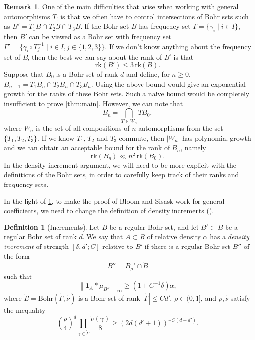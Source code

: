 \documentclass{daj}
\theoremstyle{definition}
\newtheorem{definition}[theorem]{Definition}
\newtheorem{remark}[theorem]{Remark}
\newcommand{\m}[1]{\mu_{#1}}
\newcommand{\ind}[1]{\mathbf{1}_{#1}}
\newcommand{\norm}[1]{\left\|#1\right\|}
\begin{document}
\begin{remark}
\label{rem:frequencysets}
One of the main difficulties that arise when working with general automorphisms $T_i$ is that we often have to control intersections of Bohr sets such as $B' = T_1B \cap T_2B \cap T_3B$. If the Bohr set $B$ has frequency set $\Gamma = \{\gamma_i \mid i\in I\}$, then $B'$ can be viewed as a Bohr set with frequency set $\Gamma' = \{\gamma_i \circ T_j^{-1}\mid i\in I, j\in \{1,2,3\}\}$. If we don't know anything about the frequency set of $B$, then the best we can say about the rank of $B'$ is that 
\begin{equation*}
\mathrm{rk}(B') \leq 3\,\mathrm{rk}(B).
\end{equation*}
Suppose that $B_0$ is a Bohr set of rank $d$ and define, for $n\geq 0$, $B_{n+1} = T_1B_n \cap T_2B_n \cap T_3B_n$. Using the above bound would give an exponential growth for the ranks of these Bohr sets. Such a naive bound would be completely insufficient to prove \cref{thm:main}. However, we can note that 
\begin{equation*}
B_n = \bigcap_{T\in W_n} TB_0,
\end{equation*}
where $W_n$ is the set of all compositions of $n$ automorphisms from the set $\{T_1, T_2, T_3\}$. If we know $T_1$, $T_2$ and $T_3$ commute, then $|W_n|$ has polynomial growth and we can obtain an acceptable bound for the rank of $B_n$, namely 
\begin{equation*}
\mathrm{rk}(B_n) \ll n^2\,\mathrm{rk}(B_0).
\end{equation*}
In the density increment argument, we will need to be more explicit with the definitions of the Bohr sets, in order to carefully keep track of their ranks and frequency sets.
\end{remark}

In the light of \cref{rem:frequencysets}, to make the proof of Bloom and Sisask work for general coefficients, we need to change the definition of density increments (\cite[Definition~5.1]{BS}). 

\begin{definition}[Increments]
\label{def:increments}
Let $B$ be a regular Bohr set, and let $B' \subset B$ be a regular Bohr set of rank $d$. We say that $A\subset B$ of relative density $\alpha$ has a \emph{density increment} of strength $[\delta, d'; C]$ relative to $B'$ if there is a regular Bohr set $B''$ of the form 
\begin{equation*}
B'' = B_{\rho}' \cap \widetilde{B}
\end{equation*}
such that 
\begin{equation*}
\norm{\ind{A} * \m{B''}}_{\infty} \geq (1+C^{-1}\delta) \alpha,
\end{equation*}
where $\widetilde{B} = \mathrm{Bohr}(\widetilde{\Gamma}, \widetilde{\nu})$ is a Bohr set of rank $|\widetilde{\Gamma}| \leq C d'$, $\rho \in (0, 1]$, and $\rho, \widetilde{\nu}$ satisfy the inequality
\begin{equation}
\label{eq:defsizebound}
\left(\frac{\rho}{4}\right)^d \prod_{\gamma \in \widetilde{\Gamma}} \frac{\widetilde{\nu}(\gamma)}{8} \geq (2d(d'+1))^{-C(d+d')}.
\end{equation}
\end{definition}
\end{document}
